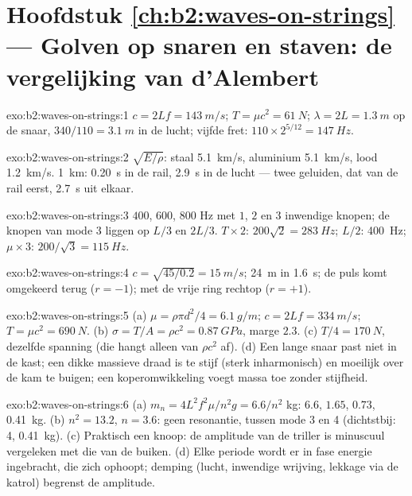 \section*{Hoofdstuk \ref{ch:b2:waves-on-strings} --- Golven op snaren en
staven: de vergelijking van d'Alembert}

\begin{solution}{exo:b2:waves-on-strings:1}
$c = 2Lf = \qty{143}{m/s}$; $T = \mu c^2 = \qty{61}{N}$;
$\lambda = 2L = \qty{1.3}{m}$ op de snaar, $340/110 = \qty{3.1}{m}$ in de
lucht; vijfde fret: $110 \times 2^{5/12} =
\qty{147}{Hz}$.
\end{solution}

\begin{solution}{exo:b2:waves-on-strings:2}
$\sqrt{E/\rho}$: staal \qty{5.1}{km/s}, aluminium \qty{5.1}{km/s}, lood
\qty{1.2}{km/s}. \qty{1}{km}: \qty{0.20}{s} in de rail, \qty{2.9}{s} in de
lucht --- twee geluiden, dat van de rail eerst, \qty{2.7}{s} uit elkaar.
\end{solution}

\begin{solution}{exo:b2:waves-on-strings:3}
$400$, $600$, $800$ Hz met $1$, $2$ en $3$ inwendige knopen; de knopen van
mode 3 liggen op $L/3$ en $2L/3$. $T \times 2$: $200\sqrt2 = \qty{283}{Hz}$;
$L/2$: \qty{400}{Hz}; $\mu
\times 3$: $200/\sqrt3 = \qty{115}{Hz}$.
\end{solution}

\begin{solution}{exo:b2:waves-on-strings:4}
$c = \sqrt{45/0.2} = \qty{15}{m/s}$; \qty{24}{m} in \qty{1.6}{s}; de puls
komt omgekeerd terug ($r = -1$); met de vrije ring rechtop ($r = +1$).
\end{solution}

\begin{solution}{exo:b2:waves-on-strings:5}
(a) $\mu = \rho\pi d^2/4 = \qty{6.1}{g/m}$; $c = 2Lf = \qty{334}{m/s}$;
$T = \mu c^2 =
\qty{690}{N}$. (b)
$\sigma = T/A = \rho c^2 = \qty{0.87}{GPa}$, marge $2.3$. (c)
$T/4 =
\qty{170}{N}$, dezelfde spanning (die hangt alleen van $\rho c^2$
af). (d) Een lange snaar past niet in de kast; een dikke massieve draad is
te stijf (sterk inharmonisch) en moeilijk over de kam te buigen; een
koperomwikkeling voegt massa toe zonder stijfheid.
\end{solution}

\begin{solution}{exo:b2:waves-on-strings:6}
(a) $m_n = 4L^2f^2\mu/n^2g = 6.6/n^2$ kg: $6.6$, $1.65$, $0.73$,
\qty{0.41}{kg}. (b) $n^2 = 13.2$, $n = 3.6$: geen resonantie, tussen mode 3
en 4 (dichtstbij: 4, \qty{0.41}{kg}). (c) Praktisch een knoop: de amplitude
van de triller is minuscuul vergeleken met die van de buiken. (d) Elke
periode wordt er in fase energie ingebracht, die zich ophoopt; demping
(lucht, inwendige wrijving, lekkage via de katrol) begrenst de amplitude.
\end{solution}

